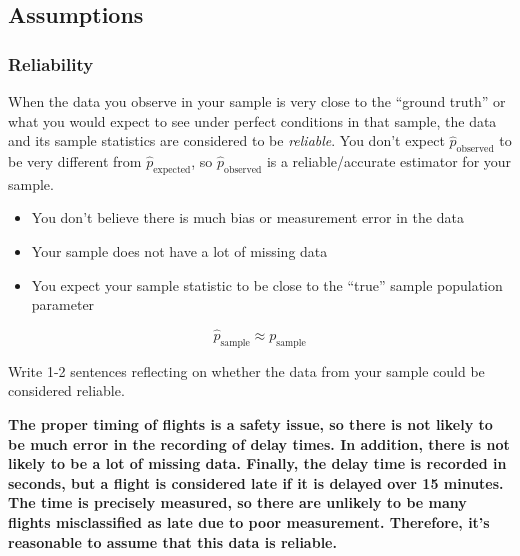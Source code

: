 \documentclass[
  letterpaper,
  DIV=11,
  numbers=noendperiod]{scrartcl}
\begin{document}
\subsection{Assumptions}\label{assumptions}

\subsubsection{Reliability}\label{reliability}

When the data you observe in your sample is very close to the ``ground
truth'' or what you would expect to see under perfect conditions in that
sample, the data and its sample statistics are considered to be
\emph{reliable}. You don't expect \(\hat{p}_{\text{observed}}\) to be
very different from \(\hat{p}_{\text{expected}}\), so
\(\hat{p}_{\text{observed}}\) is a reliable/accurate estimator for your
sample.

\begin{itemize}
\item
  You don't believe there is much bias or measurement error in the data
\item
  Your sample does not have a lot of missing data
\item
  You expect your sample statistic to be close to the ``true'' sample
  population parameter
\end{itemize}

\[\hat{p}_{\text{sample}} \approx p_{\text{sample}}\]

Write 1-2 sentences reflecting on whether the data from your sample
could be considered reliable.

\begin{tcolorbox}[enhanced jigsaw, colback=white, breakable, arc=.35mm, left=2mm, colframe=quarto-callout-warning-color-frame, opacityback=0, rightrule=.15mm, toprule=.15mm, bottomrule=.15mm, leftrule=.75mm]

\textbf{The proper timing of flights is a safety issue, so there is not
likely to be much error in the recording of delay times. In addition,
there is not likely to be a lot of missing data. Finally, the delay time
is recorded in seconds, but a flight is considered late if it is delayed
over 15 minutes. The time is precisely measured, so there are unlikely
to be many flights misclassified as late due to poor measurement.
Therefore, it's reasonable to assume that this data is reliable.}

\end{tcolorbox}
\end{document}
